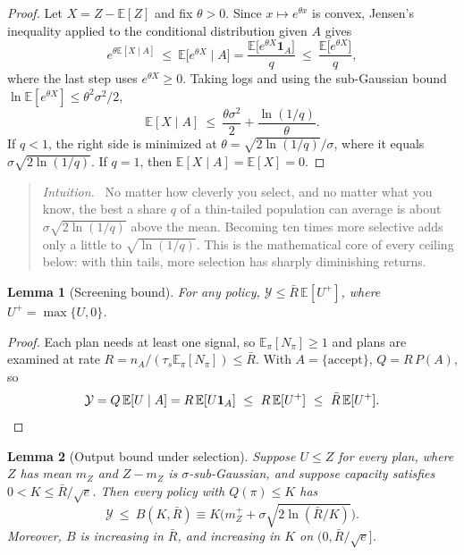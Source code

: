 \documentclass[11pt]{article}
\newtheorem{lemma}{Lemma}
\theoremstyle{remark}
\newenvironment{intuition}{\begin{quote}\small\color{muted}\textit{Intuition.}\ }{\end{quote}}
\newcommand{\E}{\mathbb{E}}
\newcommand{\Ycal}{\mathcal{Y}}
\newcommand{\accept}{\text{accept}}
\begin{document}
\begin{proof}
Let $X=Z-\E[Z]$ and fix $\theta>0$. Since $x\mapsto e^{\theta x}$ is convex, Jensen's inequality applied to the conditional distribution given $A$ gives
\[
e^{\theta\E[X\mid A]}\ \le\ \E\big[e^{\theta X}\mid A\big]=\frac{\E\big[e^{\theta X}\mathbf 1_A\big]}{q}\ \le\ \frac{\E\big[e^{\theta X}\big]}{q},
\]
where the last step uses $e^{\theta X}\ge0$. Taking logs and using the sub-Gaussian bound $\ln\E[e^{\theta X}]\le\theta^2\sigma^2/2$,
\[
\E[X\mid A]\ \le\ \frac{\theta\sigma^2}{2}+\frac{\ln(1/q)}{\theta}.
\]
If $q<1$, the right side is minimized at $\theta=\sqrt{2\ln(1/q)}/\sigma$, where it equals $\sigma\sqrt{2\ln(1/q)}$. If $q=1$, then $\E[X\mid A]=\E[X]=0$.
\end{proof}

\begin{intuition}
No matter how cleverly you select, and no matter what you know, the best a share $q$ of a thin-tailed population can average is about $\sigma\sqrt{2\ln(1/q)}$ above the mean. Becoming ten times more selective adds only a little to $\sqrt{\ln(1/q)}$. This is the mathematical core of every ceiling below: with thin tails, more selection has sharply diminishing returns.
\end{intuition}

\begin{lemma}[Screening bound]\label{lem:screening}
For any policy, $\Ycal\le\bar R\,\E[U^+]$, where $U^+=\max\{U,0\}$.
\end{lemma}

\begin{proof}
Each plan needs at least one signal, so $\E_\pi[N_\pi]\ge1$ and plans are examined at rate $R=n_A/(\tau_s\E_\pi[N_\pi])\le\bar R$. With $A=\{\accept\}$, $Q=R\,P(A)$, so
\[
\Ycal=Q\,\E[U\mid A]=R\,\E[U\mathbf 1_A]\ \le\ R\,\E[U^+]\ \le\ \bar R\,\E[U^+].\qedhere
\]
\end{proof}

\begin{lemma}[Output bound under selection]\label{lem:output}
Suppose $U\le Z$ for every plan, where $Z$ has mean $m_Z$ and $Z-m_Z$ is $\sigma$-sub-Gaussian, and suppose capacity satisfies $0<K\le\bar R/\sqrt e$. Then every policy with $Q(\pi)\le K$ has
\[
\Ycal\ \le\ B(K,\bar R)\equiv K\Big(m_Z^++\sigma\sqrt{2\ln(\bar R/K)}\Big).
\]
Moreover, $B$ is increasing in $\bar R$, and increasing in $K$ on $(0,\bar R/\sqrt e]$.
\end{lemma}
\end{document}
